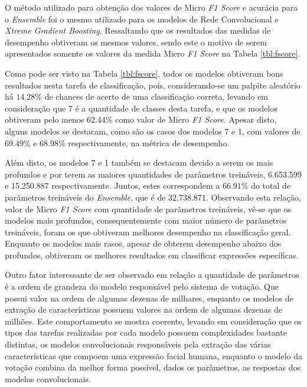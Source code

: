 O método utilizado para obtenção dos valores de Micro \textit{F1 Score} e acurácia para o \textit{Ensemble} foi o mesmo utilizado para os modelos de Rede Convolucional e \textit{Xtreme Gradient Boosting}. Ressaltando que os resultados das medidas de desempenho obtiveram os mesmos valores, sendo este o motivo de serem apresentados somente os valores da medida Micro \textit{F1 Score} na Tabela \ref{tbl:fscore}.



Como pode ser visto na Tabela \ref{tbl:fscore}, todos os modelos obtiveram bons resultados nesta tarefa de classificação, pois, considerando-se um palpite aleatório há $14.28$\% de chances de acerto de uma classificação correta, levando em consideração que $7$ é a quantidade de classes desta tarefa, e que os modelos obtiveram pelo menos $62.44$\% como valor de Micro \textit{F1 Score}. Apesar disto, alguns modelos se destacam, como são os casos dos modelos 7 e 1, com valores de $69.49$\% e $68.98$\% respectivamente, na métrica de desempenho.

Além disto, os modelos 7 e 1 também se destacam devido a serem os mais profundos e por terem as maiores quantidades de parâmetros treináveis, 6.653.599 e 15.250.887 respectivamente. Juntos, estes correspondem a $66.91$\% do total de parâmetros treináveis do \textit{Ensemble}, que é de $32.738.871$. Observando esta relação, valor de Micro \textit{F1 Score} com quantidade de parâmetros treináveis, vê-se que os modelos mais profundos, consequentemente com maior número de parâmetros treináveis, foram os que obtiveram melhores desempenho na classificação geral. Enquanto os modelos mais rasos, apesar de obterem desempenho abaixo dos profundos, obtiveram os melhores resultados em classificar expressões específicas.

Outro fator interessante de ser observado em relação a quantidade de parâmetros é a ordem de grandeza do modelo responsável pelo sistema de votação. Que possui valor na ordem de algumas dezenas de milhares, enquanto os modelos de extração de características possuem valores na ordem de algumas dezenas de milhões. Este comportamento se mostra coerente, levando em consideração que os tipos das tarefas realizadas por cada modelo possuem complexidades bastante distintas, os modelos convolucionais responsáveis pela extração das várias características que compoem uma expressão facial humana, enquanto o modelo da votação combina da melhor forma possível, dados os parâmetros, as respostas dos modelos convolucionais.

